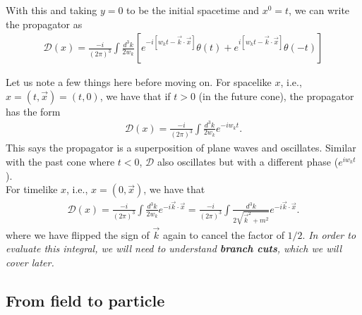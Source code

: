 \documentclass{book}
\theoremstyle{definition}
\newcommand{\f}[2]{\frac{#1}{#2}}
\newcommand{\lb}{\left[}
\newcommand{\rb}{\right]}
\newcommand{\D}{\mathcal{D}}
\begin{document}
With this and taking $y = 0$ to be the initial spacetime and $x^0 = t$,  we can write the propagator as
\begin{align}\label{propag}
\boxed{\D(x) = \f{-i}{(2\pi)^3}\int \f{d^3k}{ 2 w_k} \lb e^{-i[w_kt - \vec{k}\cdot\vec{x}]}\theta(t) + e^{i[w_kt - \vec{k}\cdot\vec{x} ]}\theta(-t)\rb}
\end{align}

Let us note a few things here before moving on. For spacelike $x$, i.e., $x = (t,\vec{x}) = (t,0)$, we have that if $t >0$ (in the future cone), the propagator has the form
\begin{align}
\D(x) = \f{-i}{(2\pi)^3}\int \f{d^3k}{2 w_k}e^{-iw_kt}.
\end{align}
This says the propagator is a superposition of plane waves and oscillates. Similar with the past cone where $t<0$, $\D$ also oscillates but with a different phase ($e^{iw_kt}$). \\

For timelike $x$, i.e., $x = (0,\vec{x})$, we have that 
\begin{align}
\D(x) = \f{-i}{(2\pi)^3}\int \f{d^3k}{ 2 w_k}e^{-i\vec{k}\cdot\vec{x}} =\f{-i}{(2\pi)^3}\int \f{d^3k}{ 2 \sqrt{\vec{k}^2 + m^2}}e^{-i\vec{k}\cdot\vec{x}} .
\end{align}
where we have flipped the sign of $\vec{k}$ again to cancel the factor of $1/2$. \textit{In order to evaluate this integral, we will need to understand \textbf{branch cuts}, which we will cover later. }






































\newpage





\subsection{From field to particle}
\end{document}
